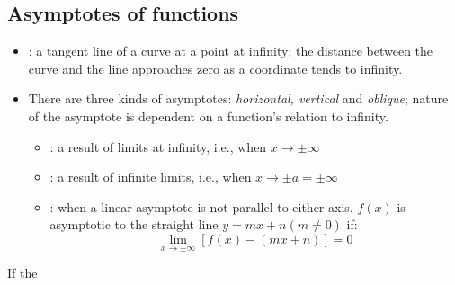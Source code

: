 \begin{itemize}
  \subsection{Asymptotes of functions}
  \begin{itemize}
    \item  {}: a tangent line of a curve at a point at infinity; the distance between the curve and the line approaches zero as a coordinate tends to infinity.
    \item There are three kinds of asymptotes: \textit{horizontal, vertical} and \textit{oblique}; nature of the asymptote is dependent on a function's relation to infinity.
      \begin{itemize}
        \item {}: a result of limits at infinity, i.e., when \(x\to \pm \infty\)
        \item {}: a result of infinite limits, i.e., when \(x\to \pm a = \pm \infty\)
        \item {}: when a linear asymptote is not parallel to either axis. \(f(x)\) is asymptotic to the straight line \(y=mx+n (m\neq 0)\) if:
        \[%
        \lim_{x \to \pm\infty} \left[
          f(x) - \left(
            mx + n
          \right) 
        \right] = 0
        \]%
      \end{itemize}
  \end{itemize}

  If the \end{itemize}